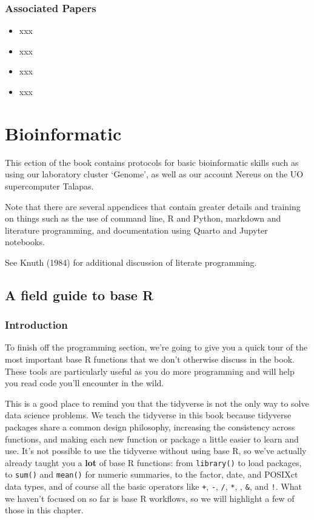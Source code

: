 \documentclass[
  letterpaper,
  DIV=11,
  numbers=noendperiod]{scrreprt}
\providecommand{\tightlist}{%
  \setlength{\itemsep}{0pt}\setlength{\parskip}{0pt}}\usepackage{longtable,booktabs,array}
\begin{document}
\hypertarget{associated-papers-46}{%
\section{Associated Papers}\label{associated-papers-46}}

\begin{itemize}
\tightlist
\item
  xxx
\item
  xxx
\item
  xxx
\item
  xxx
\end{itemize}

\part{Bioinformatic}

This ection of the book contains protocols for basic bioinformatic
skills such as using our laboratory cluster `Genome', as well as our
account Nereus on the UO supercomputer Talapas.

Note that there are several appendices that contain greater details and
training on things such as the use of command line, R and Python,
markdown and literature programming, and documentation using Quarto and
Jupyter notebooks.

See Knuth (1984) for additional discussion of literate programming.

\hypertarget{sec-base-r}{%
\chapter{A field guide to base R}\label{sec-base-r}}

\hypertarget{introduction-71}{%
\section{Introduction}\label{introduction-71}}

To finish off the programming section, we're going to give you a quick
tour of the most important base R functions that we don't otherwise
discuss in the book. These tools are particularly useful as you do more
programming and will help you read code you'll encounter in the wild.

This is a good place to remind you that the tidyverse is not the only
way to solve data science problems. We teach the tidyverse in this book
because tidyverse packages share a common design philosophy, increasing
the consistency across functions, and making each new function or
package a little easier to learn and use. It's not possible to use the
tidyverse without using base R, so we've actually already taught you a
\textbf{lot} of base R functions: from \texttt{library()} to load
packages, to \texttt{sum()} and \texttt{mean()} for numeric summaries,
to the factor, date, and POSIXct data types, and of course all the basic
operators like \texttt{+}, \texttt{-}, \texttt{/}, \texttt{*},
\texttt{\textbar{}}, \texttt{\&}, and \texttt{!}. What we haven't
focused on so far is base R workflows, so we will highlight a few of
those in this chapter.
\end{document}
